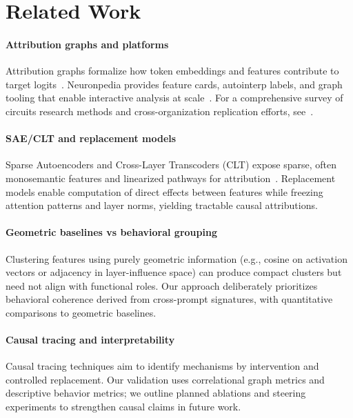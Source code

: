 
\section{Related Work}
\label{sec:related}

\paragraph{Attribution graphs and platforms}
Attribution graphs formalize how token embeddings and features contribute to target logits~\cite{ameisen2025circuittracing}. Neuronpedia provides feature cards, autointerp labels, and graph tooling that enable interactive analysis at scale~\cite{neuronpedia2025}. For a comprehensive survey of circuits research methods and cross-organization replication efforts, see~\cite{lindsey2025landscape}.

\paragraph{SAE/CLT and replacement models}
Sparse Autoencoders and Cross-Layer Transcoders (CLT) expose sparse, often monosemantic features and linearized pathways for attribution~\cite{bricken2023monosemanticity,templeton2024scaling,crosscoders2024}. Replacement models enable computation of direct effects between features while freezing attention patterns and layer norms, yielding tractable causal attributions.

\paragraph{Geometric baselines vs behavioral grouping}
Clustering features using purely geometric information (e.g., cosine on activation vectors or adjacency in layer-influence space) can produce compact clusters but need not align with functional roles. Our approach deliberately prioritizes behavioral coherence derived from cross-prompt signatures, with quantitative comparisons to geometric baselines.

\paragraph{Causal tracing and interpretability}
Causal tracing techniques aim to identify mechanisms by intervention and controlled replacement. Our validation uses correlational graph metrics and descriptive behavior metrics; we outline planned ablations and steering experiments to strengthen causal claims in future work.

